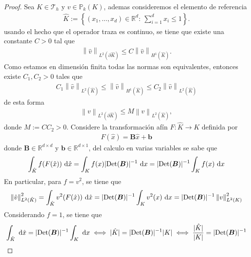 \documentclass[10pt,a4paper]{report}
\newcommand{\bs}{\boldsymbol}
\newcommand{\dx}{\textup{d}x}
\providecommand{\norm}[1]{\left\lVert#1\right\rVert}
\begin{document}
    \begin{proof}
    	Sea $K\in \mathscr{T}_{h}$ y $v\in \mathbb{P}_{k}(K)$, ademas consideremos el elemento de referencia 
    	\begin{align*}
    		\hat{K} := \left\{ (x_{1},\dots,x_{d})\in\mathbb{R}^{d}: \ \sum_{i=1}^{d}x_{i}\leq 1\right\} .
    	\end{align*}
        usando el hecho que el operador traza es continuo, se tiene que existe una constante $C>0$ tal que 
        \begin{align*}
        	\norm{\hat{v}}_{L^{2}(\partial\hat{K})} \leq C\norm{\hat{v}}_{H^{1}(\hat{K})}.
        \end{align*}
        Como estamos en dimensión finita todas las normas son equivalentes, entonces existe $C_{1},C_{2}>0$ tales que
        \begin{align*}
        	C_{1}\norm{\hat{v}}_{L^{2}(\hat{K})} \leq \norm{\hat{v}}_{H^{1}(\hat{K})} \leq C_{2}\norm{\hat{v}}_{L^{2}(\hat{K})}
        \end{align*}
        de esta forma 
        \begin{align*}
        	\norm{v}_{L^{2}(\partial\hat{K})} \leq M\norm{v}_{L^{2}(\hat{K})},
        \end{align*}
        donde $M := CC_{2}>0$.
        Considere la transformación afín $F:\hat{K}\longrightarrow K$ definida por 
        \begin{align*}
        	F(\hat{x}) = \textbf{B}\hat{x} + \bs{b}
        \end{align*}
        donde $\bs{B}\in\mathbb{R}^{d\times d}$ y $\bs{b}\in \mathbb{R}^{d\times 1}$, del calculo en varias variables se sabe que 
        \begin{align*}
        	\int_{\hat{K}}f(F(\hat{x}))\ \textup{d}\hat{x} = \int_{K} f(x)|\textup{Det}(\bs{B})|^{-1}\ \dx = |\textup{Det}(\bs{B})|^{-1}\int_{K} f(x)\ \dx
        \end{align*}
        En particular, para $f = v^{2}$, se tiene que
        \begin{align*}
        	\norm{\hat{v}}^{2}_{L^{2}(\hat{K})}= \int_{\hat{K}}v^{2}(F(\hat{x}))\ \textup{d}\hat{x} = |\textup{Det}(\bs{B})|^{-1}\int_{K} v^{2}(x)\ \dx = |\textup{Det}(\bs{B})|^{-1}\norm{v}^{2}_{L^{2}(K)}
        \end{align*}
        Considerando $f = 1$, se tiene que
        \begin{align*}
        	\int_{\hat{K}}\ \textup{d}\hat{x} = |\textup{Det}(\bs{B})|^{-1}\int_{K}\ \dx \iff |\hat{K}| = |\textup{Det}(\bs{B})|^{-1} |K| \iff \frac{|\hat{K}|}{|K|} = |\textup{Det}(\bs{B})|^{-1}

\end{align*}
\end{proof}
\end{document}
